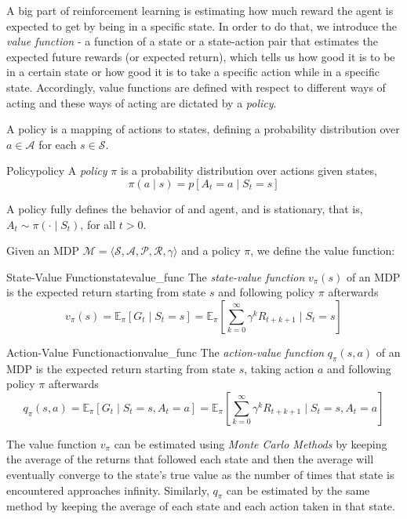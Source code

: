 A big part of reinforcement learning is estimating how much reward the agent is expected to get by being in a specific state. In order to do that, we introduce the \textit{value function} - a function of a state or a state-action pair that estimates the expected future rewards (or expected return), which tells us how good it is to be in a certain state or how good it is to take a specific action while in a specific state. Accordingly, value functions are defined with respect to different ways of acting and these ways of acting are dictated by a \textit{policy}. 

A policy is a mapping of actions to states, defining a probability distribution over $a \in \mathcal{A}$ for each $s \in \mathcal{S}$.
\begin{definition}{Policy}{policy}
      A \textit{policy} $\pi$ is a probability distribution over actions given states,
      \begin{equation}\label{eq:policy_def}
            \pi(a \mid s) = p[A_t = a \mid  S_t = s]
      \end{equation}  
\end{definition}
A policy fully defines the behavior of and agent, and is stationary, that is, $A_t \sim \pi(\cdot \mid S_t)$, for all $t > 0$.

Given an MDP $\mathcal{M} = \langle \mathcal{S}, \mathcal{A}, \mathcal{P}, \mathcal{R}, \gamma \rangle$ and a policy $\pi$, we define the value function:
\begin{definition}{State-Value Function}{statevalue_func}
      The \textit{state-value function} $v_\pi(s)$ of an MDP is the expected return starting from state $s$ and following policy $\pi$ afterwards
      \begin{equation}\label{eq:statevalue_func_def}
            v_\pi(s) = \mathbb{E}_\pi[G_t \mid S_t = s] = \mathbb{E}_\pi\left[\sum^{\infty}_{k=0}\gamma^kR_{t+k+1}\mid S_t = s\right]
      \end{equation}  
\end{definition}

\begin{definition}{Action-Value Function}{actionvalue_func}
      The \textit{action-value function} $q_\pi(s, a)$ of an MDP is the expected return starting from state $s$, taking action $a$ and following policy $\pi$ afterwards
      \begin{equation}\label{eq:actionvalue_func_def}
            q_\pi(s, a) = \mathbb{E}_\pi[G_t \mid S_t = s, A_t = a] = \mathbb{E}_\pi\left[\sum^{\infty}_{k=0}\gamma^kR_{t+k+1}\mid S_t = s, A_t = a\right]
      \end{equation}  
\end{definition}
The value function $v_\pi$ can be estimated using \textit{Monte Carlo Methods} by keeping the average of the returns that followed each state and then the average will eventually converge to the state's true value as the number of times that state is encountered approaches infinity. Similarly, $q_\pi$ can be estimated by the same method by keeping the average of each state and each action taken in that state.

